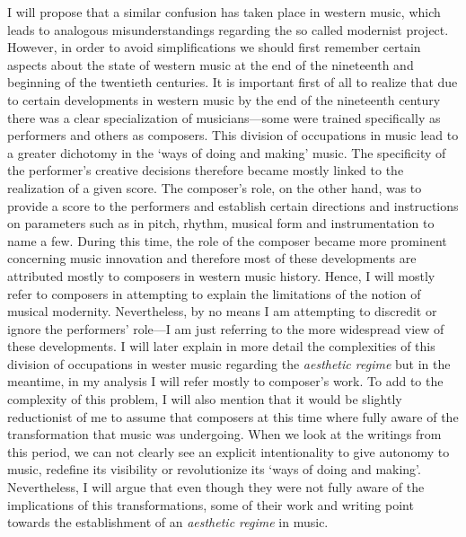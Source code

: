 I will propose that a similar confusion has taken place in western music, which leads to analogous misunderstandings regarding the so called modernist project. However, in order to avoid simplifications we should first remember certain aspects about the state of western music at the end of the nineteenth and beginning of the twentieth centuries. It is important first of all to realize that due to certain developments in western music by the end of the nineteenth century there was a clear specialization of musicians---some were trained specifically as performers and others as composers. This division of occupations in music lead to a greater dichotomy in the `ways of doing and making' music. The specificity of the performer's creative decisions therefore became mostly linked to the realization of a given score. The composer's role, on the other hand, was to provide a score to the performers and establish certain directions and instructions on parameters such as in pitch, rhythm, musical form and instrumentation to name a few. During this time, the role of the composer became more prominent concerning music innovation and therefore most of these developments are attributed mostly to composers in western music history. Hence, I will mostly refer to composers in attempting to explain the limitations of the notion of musical modernity. Nevertheless, by no means I am attempting to discredit or ignore the performers' role---I am just referring to the more widespread view of these developments. I will later explain in more detail the complexities of this division of occupations in wester music regarding the \emph{aesthetic regime} but in the meantime, in my analysis I will refer mostly to composer's work. To add to the complexity of this problem, I will also mention that it would be slightly reductionist of me to assume that composers at this time where fully aware of the transformation that music was undergoing. When we look at the writings from this period, we can not clearly see an explicit intentionality to give autonomy to music, redefine its visibility or revolutionize its `ways of doing and making'. Nevertheless, I will argue that even though they were not fully aware of the implications of this transformations, some of their work and writing point towards the establishment of an \emph{aesthetic regime} in music.

